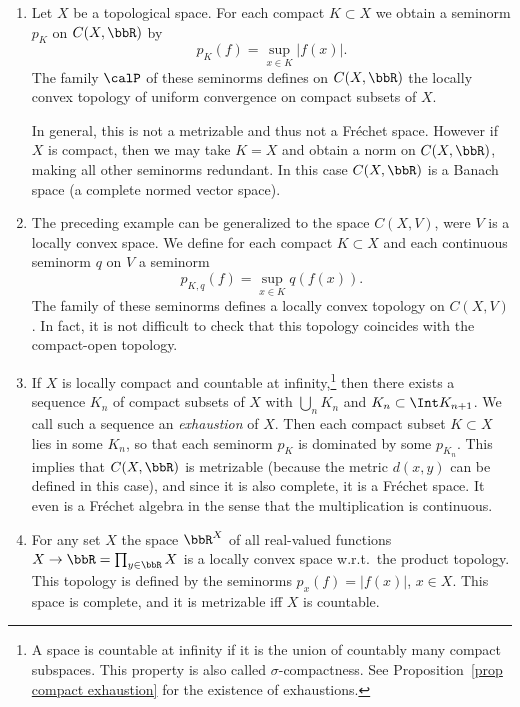 \begin{example}
    \begin{enumerate}[label=(\alph*)]
        \item Let $X$ be a topological space. For each compact $K\subset X$ we obtain a seminorm $p_K$ on $C(X,\bbR)$ by
        \[p_K(f)=\sup_{x\in K}|f(x)|.\]
        The family $\calP$ of these seminorms defines on $C(X,\bbR)$ the locally convex topology of uniform convergence on compact subsets of $X$. 
        
        In general, this is not a metrizable and thus not a Fr\'echet space. However if $X$ is compact, then we may take $K=X$ and obtain a norm on $C(X,\bbR)$, making all other seminorms redundant. In this case $C(X,\bbR)$ is a Banach space (a complete normed vector space).
        \item The preceding example can be generalized to the space $C(X,V)$, were $V$ is a locally convex space. We define for each compact $K\subset X$ and each continuous seminorm $q$ on $V$ a seminorm
        \[p_{K,q}(f)=\sup_{x\in K} q(f(x)).\]
        The family of these seminorms defines a locally convex topology on $C(X,V)$. In fact, it is not difficult to check that this topology coincides with the compact-open topology.
        \item If $X$ is locally compact and countable at infinity,\footnote{A space is countable at infinity if it is the union of countably many compact subspaces. This property is also called $\sigma$-compactness. See Proposition~\ref{prop compact exhaustion} for the existence of exhaustions.} then there exists a sequence $K_n$ of compact subsets of $X$ with $\bigcup_n K_n$ and $K_n\subset \Int K_{n+1}$. We call such a sequence an \emph{exhaustion} of $X$. Then each compact subset $K\subset X$ lies in some $K_n$, so that each seminorm $p_K$ is dominated by some $p_{K_n}$. This implies that $C(X,\bbR)$ is metrizable (because the metric $d(x,y)$ can be defined in this case), and since it is also complete, it is a Fr\'echet space. It even is a Fr\'echet algebra in the sense that the multiplication is continuous.
        \item For any set $X$ the space $\bbR^X$ of all real-valued functions $X\to \bbR=\prod_{y\in \bbR} X$ is a locally convex space w.r.t.\ the product topology. This topology is defined by the seminorms $p_x(f)=|f(x)|$, $x\in X$. This space is complete, and it is metrizable iff $X$ is countable.
    \end{enumerate}
\end{example}

